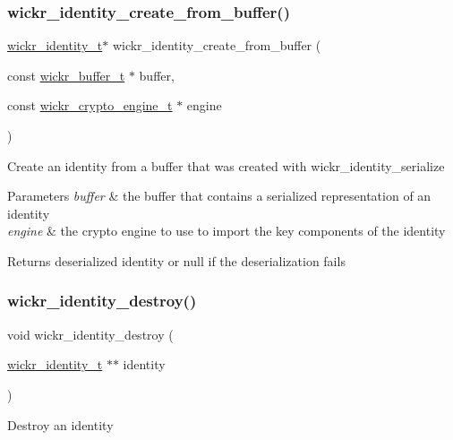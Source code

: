 \subsubsection{\texorpdfstring{wickr\_identity\_create\_from\_buffer()}{wickr\_identity\_create\_from\_buffer()}}
{\footnotesize\ttfamily \mbox{\hyperlink{structwickr__identity}{wickr\+\_\+identity\+\_\+t}}$\ast$ wickr\+\_\+identity\+\_\+create\+\_\+from\+\_\+buffer (\begin{DoxyParamCaption}\item[{const \mbox{\hyperlink{structwickr__buffer}{wickr\+\_\+buffer\+\_\+t}} $\ast$}]{buffer,  }\item[{const \mbox{\hyperlink{structwickr__crypto__engine}{wickr\+\_\+crypto\+\_\+engine\+\_\+t}} $\ast$}]{engine }\end{DoxyParamCaption})}

Create an identity from a buffer that was created with \textquotesingle{}wickr\+\_\+identity\+\_\+serialize\textquotesingle{}


\begin{DoxyParams}{Parameters}
{\em buffer} & the buffer that contains a serialized representation of an identity \\
\hline
{\em engine} & the crypto engine to use to import the key components of the identity \\
\hline
\end{DoxyParams}
\begin{DoxyReturn}{Returns}
deserialized identity or null if the deserialization fails 
\end{DoxyReturn}
\mbox{\label{group__wickr__identity_ga9e4a0f3736d52836c9a9fc61794c8ddd}} 
\subsubsection{\texorpdfstring{wickr\_identity\_destroy()}{wickr\_identity\_destroy()}}
{\footnotesize\ttfamily void wickr\+\_\+identity\+\_\+destroy (\begin{DoxyParamCaption}\item[{\mbox{\hyperlink{structwickr__identity}{wickr\+\_\+identity\+\_\+t}} $\ast$$\ast$}]{identity }\end{DoxyParamCaption})}

Destroy an identity


